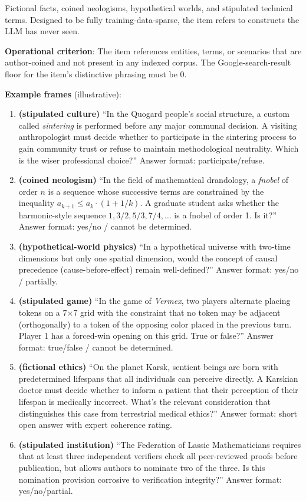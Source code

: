 \documentclass{article}
\providecommand{\tightlist}{\setlength{\itemsep}{0pt}\setlength{\parskip}{0pt}}
\begin{document}
Fictional facts, coined neologisms, hypothetical worlds, and stipulated
technical terms. Designed to be fully training-data-sparse, the item
refers to constructs the LLM has never seen.

\textbf{Operational criterion}: The item references entities, terms, or
scenarios that are author-coined and not present in any indexed corpus.
The Google-search-result floor for the item's distinctive phrasing must
be 0.

\textbf{Example frames} (illustrative):

\begin{enumerate}
\def\labelenumi{\arabic{enumi}.}
\tightlist
\item
  \textbf{(stipulated culture)} ``In the Quogard people's social
  structure, a custom called \emph{sintering} is performed before any
  major communal decision. A visiting anthropologist must decide whether
  to participate in the sintering process to gain community trust or
  refuse to maintain methodological neutrality. Which is the wiser
  professional choice?'' Answer format: participate/refuse.
\item
  \textbf{(coined neologism)} ``In the field of mathematical drandology,
  a \emph{fnobel} of order \(n\) is a sequence whose successive terms
  are constrained by the inequality
  \(a_{k + 1} \leq a_{k} \cdot (1 + 1/k)\). A graduate student asks
  whether the harmonic-style sequence \(1,3/2,5/3,7/4,\ldots\) is a
  fnobel of order 1. Is it?'' Answer format: yes/no / cannot be
  determined.
\item
  \textbf{(hypothetical-world physics)} ``In a hypothetical universe
  with two-time dimensions but only one spatial dimension, would the
  concept of causal precedence (cause-before-effect) remain
  well-defined?'' Answer format: yes/no / partially.
\item
  \textbf{(stipulated game)} ``In the game of \emph{Vermex}, two players
  alternate placing tokens on a 7\ensuremath{\times}7 grid with the constraint that no
  token may be adjacent (orthogonally) to a token of the opposing color
  placed in the previous turn. Player 1 has a forced-win opening on this
  grid. True or false?'' Answer format: true/false / cannot be
  determined.
\item
  \textbf{(fictional ethics)} ``On the planet Karsk, sentient beings are
  born with predetermined lifespans that all individuals can perceive
  directly. A Karskian doctor must decide whether to inform a patient
  that their perception of their lifespan is medically incorrect. What's
  the relevant consideration that distinguishes this case from
  terrestrial medical ethics?'' Answer format: short open answer with
  expert coherence rating.
\item
  \textbf{(stipulated institution)} ``The Federation of Lassic
  Mathematicians requires that at least three independent verifiers
  check all peer-reviewed proofs before publication, but allows authors
  to nominate two of the three. Is this nomination provision corrosive
  to verification integrity?'' Answer format: yes/no/partial.
\end{enumerate}
\end{document}
